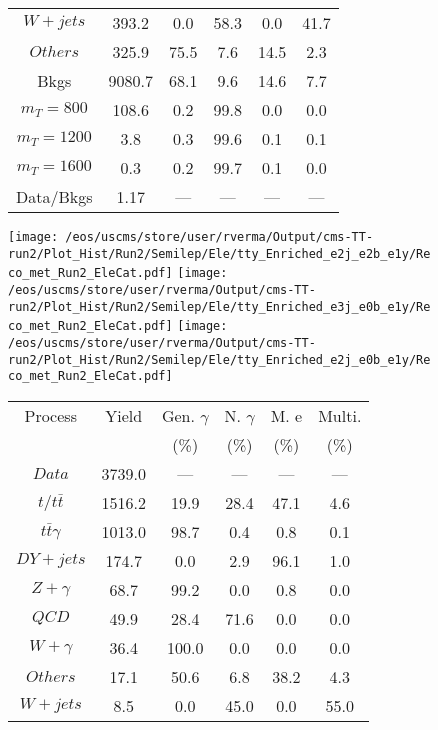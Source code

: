 \begin{figure}
\begin{minipage}[c]{0.32\textwidth}
{\begin{tabular}{cccccc}
$ W+jets $ &  393.2 &  0.0 &  58.3 &  0.0 &  41.7\\
$ Others $ &  325.9 &  75.5 &  7.6 &  14.5 &  2.3\\
Bkgs &  9080.7 &  68.1 &  9.6 &  14.6 &  7.7\\
$ m_{T} = 800 $ &  108.6 &  0.2 &  99.8 &  0.0 &  0.0\\
$ m_{T} = 1200 $ &  3.8 &  0.3 &  99.6 &  0.1 &  0.1\\
$ m_{T} = 1600 $ &  0.3 &  0.2 &  99.7 &  0.1 &  0.0\\
Data/Bkgs &  1.17 &  --- &  --- &  --- &  ---\\
\hline
\end{tabular}
}
\end{minipage}
\end{figure}

\begin{figure}
\centering
\texttt{[image: /eos/uscms/store/user/rverma/Output/cms-TT-run2/Plot\_Hist/Run2/Semilep/Ele/tty\_Enriched\_e2j\_e2b\_e1y/Reco\_met\_Run2\_EleCat.pdf]}
\texttt{[image: /eos/uscms/store/user/rverma/Output/cms-TT-run2/Plot\_Hist/Run2/Semilep/Ele/tty\_Enriched\_e3j\_e0b\_e1y/Reco\_met\_Run2\_EleCat.pdf]}
\texttt{[image: /eos/uscms/store/user/rverma/Output/cms-TT-run2/Plot\_Hist/Run2/Semilep/Ele/tty\_Enriched\_e2j\_e0b\_e1y/Reco\_met\_Run2\_EleCat.pdf]}
\begin{minipage}[c]{0.32\textwidth}
\centering
\tiny{
\begin{tabular}{cccccc}
\hline
Process & Yield & Gen. $\gamma$ & N. $\gamma$ & M. e & Multi. \\
 &  & (\%) & (\%) & (\%) & (\%)  \\
\hline
                                                                      $ Data $ &  3739.0 &  --- &  --- &  --- &  ---\\
$ t/t\bar{t} $ &  1516.2 &  19.9 &  28.4 &  47.1 &  4.6\\
$ t\bar{t}\gamma $ &  1013.0 &  98.7 &  0.4 &  0.8 &  0.1\\
$ DY+jets $ &  174.7 &  0.0 &  2.9 &  96.1 &  1.0\\
$ Z+\gamma $ &  68.7 &  99.2 &  0.0 &  0.8 &  0.0\\
$ QCD $ &  49.9 &  28.4 &  71.6 &  0.0 &  0.0\\
$ W+\gamma $ &  36.4 &  100.0 &  0.0 &  0.0 &  0.0\\
$ Others $ &  17.1 &  50.6 &  6.8 &  38.2 &  4.3\\
$ W+jets $ &  8.5 &  0.0 &  45.0 &  0.0 &  55.0\\

\end{tabular}}
\end{minipage}
\end{figure}
